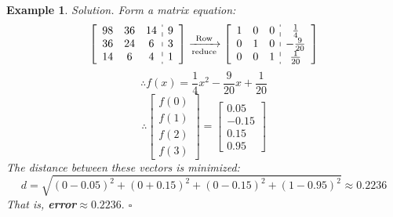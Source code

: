 \documentclass[12pt, a4paper]{article}
\newtheorem{eg}{Example}[subsection]
\newenvironment*{sol}{\indent\textit{Solution. }}{\hfill{$\square$}\par}
\begin{document}
\begin{eg}
\begin{sol}
		Form a matrix equation: 
		\[\left[\begin{array}{c:c}\begin{matrix}98&36&14\\36&24&6\\14&6&4\end{matrix}&\begin{matrix}9\\3\\1\end{matrix}\end{array}\right]\xrightarrow[\text{reduce}]{\text{Row}}\left[\begin{array}{c:c}\begin{matrix}1&0&0\\0&1&0\\0&0&1\end{matrix}&\begin{matrix}\frac{1}{4}\\-\frac{9}{20}\\\frac{1}{20}\end{matrix}\end{array}\right]\]
		\[\therefore f(x)=\frac{1}{4}x^2-\frac{9}{20}x+\frac{1}{20}\]
		\[\therefore \begin{bmatrix}f(0)\\f(1)\\f(2)\\f(3)\end{bmatrix}=\begin{bmatrix}0.05\\-0.15\\0.15\\0.95\end{bmatrix}\]
		The distance between these vectors is minimized: 
		\[d=\sqrt{(0-0.05)^2+(0+0.15)^2+(0-0.15)^2+(1-0.95)^2}\approx0.2236\]
		That is, \textbf{error}$\approx0.2236.$
	\end{sol}
\end{eg}
\end{document}
